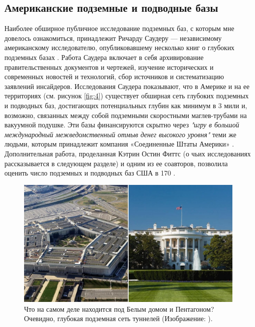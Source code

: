 \documentclass[10pt,twocolumn,letterpaper]{article}
\begin{document}
\subsection{Американские подземные и подводные базы}

Наиболее обширное публичное исследование подземных баз, с которым мне довелось ознакомиться, принадлежит Ричарду Саудеру — независимому американскому исследователю, опубликовавшему несколько книг о глубоких подземных базах \cite{22}. Работа Саудера включает в себя архивирование правительственных документов и чертежей, изучение исторических и современных новостей и технологий, сбор источников и систематизацию заявлений инсайдеров. Исследования Саудера показывают, что в Америке и на ее территориях (см. рисунок \ref{fig:4}) существует обширная сеть глубоких подземных и подводных баз, достигающих потенциальных глубин как минимум в 3 мили и, возможно, связанных между собой подземными скоростными маглев-трубами на вакуумной подушке. Эти базы финансируются скрытно через \textit{"игру в большой международный межведомственный отмыв денег высокого уровня"} теми же людьми, которым принадлежит компания «Соединенные Штаты Америки» \cite{22}. Дополнительная работа, проделанная Кэтрин Остин Фиттс (о чьих исследованиях рассказывается в следующем разделе) и одним из ее соавторов, позволила оценить число подземных и подводных баз США в 170 \cite{16,20}.

\begin{figure}[b]
\begin{center}
   \includegraphics[width=1\linewidth]{penta.jpg}
\end{center}
   \caption{Что на самом деле находится под Белым домом и Пентагоном? Очевидно, глубокая подземная сеть туннелей (Изображение: \cite{31}).}
\label{fig:3}
\label{fig:onecol}
\end{figure}
\end{document}
